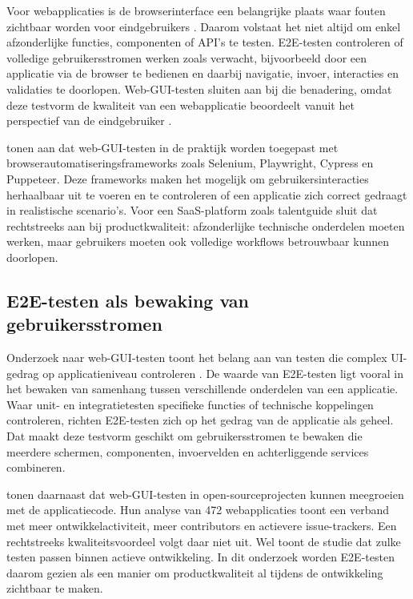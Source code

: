 Voor webapplicaties is de browserinterface een belangrijke plaats waar fouten zichtbaar worden voor eindgebruikers \autocite{DiMeglio2026}. Daarom volstaat het niet altijd om enkel afzonderlijke functies, componenten of API's te testen. E2E-testen controleren of volledige gebruikersstromen werken zoals verwacht, bijvoorbeeld door een applicatie via de browser te bedienen en daarbij navigatie, invoer, interacties en validaties te doorlopen. Web-GUI-testen sluiten aan bij die benadering, omdat deze testvorm de kwaliteit van een webapplicatie beoordeelt vanuit het perspectief van de eindgebruiker \autocite{DiMeglio2026}.

\textcite{DiMeglio2026} tonen aan dat web-GUI-testen in de praktijk worden toegepast met browserautomatiseringsframeworks zoals Selenium, Playwright, Cypress en Puppeteer. Deze frameworks maken het mogelijk om gebruikersinteracties herhaalbaar uit te voeren en te controleren of een applicatie zich correct gedraagt in realistische scenario's. Voor een SaaS-platform zoals talentguide sluit dat rechtstreeks aan bij productkwaliteit: afzonderlijke technische onderdelen moeten werken, maar gebruikers moeten ook volledige workflows betrouwbaar kunnen doorlopen.

\subsection{E2E-testen als bewaking van gebruikersstromen}

Onderzoek naar web-GUI-testen toont het belang aan van testen die complex UI-gedrag op applicatieniveau controleren \autocite{DiMeglio2026}. De waarde van E2E-testen ligt vooral in het bewaken van samenhang tussen verschillende onderdelen van een applicatie. Waar unit- en integratietesten specifieke functies of technische koppelingen controleren, richten E2E-testen zich op het gedrag van de applicatie als geheel. Dat maakt deze testvorm geschikt om gebruikersstromen te bewaken die meerdere schermen, componenten, invoervelden en achterliggende services combineren.

\textcite{DiMeglio2026} tonen daarnaast dat web-GUI-testen in open-sourceprojecten kunnen meegroeien met de applicatiecode. Hun analyse van 472 webapplicaties toont een verband met meer ontwikkelactiviteit, meer contributors en actievere issue-trackers. Een rechtstreeks kwaliteitsvoordeel volgt daar niet uit. Wel toont de studie dat zulke testen passen binnen actieve ontwikkeling. In dit onderzoek worden E2E-testen daarom gezien als een manier om productkwaliteit al tijdens de ontwikkeling zichtbaar te maken.

